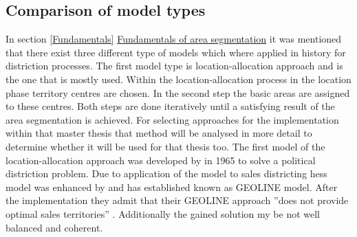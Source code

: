 \subsection{Comparison of model types}\label{comparison}
In section \ref{Fundamentals} \hyperref[Fundamentals]{Fundamentals of area segmentation} it was mentioned that there exist three different type of models which where applied in history for distriction processes. The first model type is location-allocation approach and is the one that is mostly used. Within the location-allocation process in the location phase territory centres are chosen. In the second step the basic areas are assigned to these centres. Both steps are done iteratively until a satisfying result of the area segmentation is achieved. For selecting approaches for the implementation within that master thesis that method will be analysed in more detail to determine whether it will be used for that thesis too. The first model of the location-allocation approach was developed by \citeauthor{hess} \cite{hess} in 1965 to solve a political distriction problem. Due to application of the model to sales districting hess model was enhanced by \citeauthor{hessstuart} \cite{hessstuart} and has established known as GEOLINE model. After the implementation they admit that their GEOLINE approach ''does not provide optimal sales territories'' \cite{hessstuart}. Additionally the gained solution my be not well balanced and coherent.
